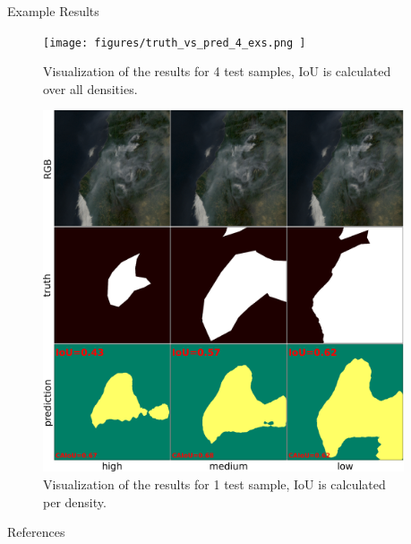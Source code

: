 \documentclass[final,16pt]{beamer}
\newlength{\sepwidth}
\newlength{\colwidth}
\newcommand{\separatorcolumn}{\begin{column}{\sepwidth}\end{column}}
\begin{document}
\begin{frame}[t]
\begin{columns}[t]
\begin{column}{\colwidth}
\begin{block}{Example Results}
        \begin{figure}
            \centering
            \texttt{[image: figures/truth\_vs\_pred\_4\_exs.png ]}
            \caption{Visualization of the results for 4 test samples, IoU is calculated over all densities.}
        \end{figure}
        \begin{figure}
            \centering
            \includegraphics[width=.6\textwidth]{figures/vulture.png }
            \caption{Visualization of the results for 1 test sample, IoU is calculated per density.}
        \end{figure}
  \end{block}
  \vspace{-1cm}
  \begin{block}{References}
    \nocite{*}
    \footnotesize{}
  \end{block}

\end{column}

\separatorcolumn
\end{columns}
\end{frame}
\end{document}
